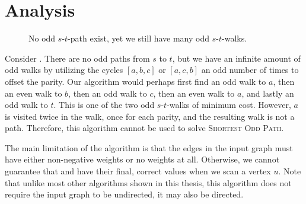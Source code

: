 \section{Analysis}

\begin{figure}
    \centering
    \caption{No odd $s$-$t$-path exist, yet we still have many odd $s$-$t$-walks.}
    \label{figure:small2}
 \end{figure}

Consider . There are no odd paths from $s$ to $t$, but we have an infinite amount of odd walks by utilizing the cycles $[a,b,c]$ or $[a,c,b]$ an odd number of times to offset the parity. Our algorithm would perhaps first find an odd walk to $a$, then an even walk to $b$, then an odd walk to $c$, then an even walk to $a$, and lastly an odd walk to $t$. This is one of the two odd $s$-$t$-walks of minimum cost. However, $a$ is visited twice in the walk, once for each parity, and the resulting walk is not a path. Therefore, this algorithm cannot be used to solve \textsc{Shortest Odd Path}.

The main limitation of the algorithm is that the edges in the input graph must have either non-negative weights or no weights at all. Otherwise, we cannot guarantee that  and  have their final, correct values when we scan a vertex $u$. Note that unlike most other algorithms shown in this thesis, this algorithm does not require the input graph to be undirected, it may also be directed.


